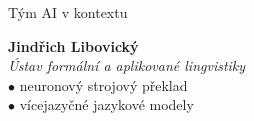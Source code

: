 \documentclass[aspectratio=169,dvipsnames]{beamer}
\begin{document}
\begin{frame}{Tým AI v kontextu}
    \hspace{80pt}\begin{minipage}{70pt}
    \end{minipage}\begin{minipage}{250pt}
        \textbf{Jindřich Libovický} \\
        \textit{Ústav formální a aplikované lingvistiky} \\
        \quad$\bullet$ neuronový strojový překlad \\
        \quad$\bullet$ vícejazyčné jazykové modely
    \end{minipage}

\end{frame}



\end{document}
